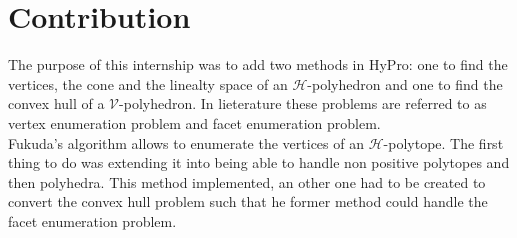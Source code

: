 \section{Contribution}
\label{section_contrib}
The purpose of this internship was to add two methods in HyPro: one to find the vertices, the cone and the linealty space of an $\mathcal{H}$-polyhedron and one to find the convex hull of a $\mathcal{V}$-polyhedron. In lieterature these problems are referred to as vertex enumeration problem and facet enumeration problem.\\
Fukuda's algorithm allows to enumerate the vertices of an $\mathcal{H}$-polytope. The first thing to do was extending it into being able to handle non positive polytopes and then polyhedra. This method implemented, an other one had to be created to convert the convex hull problem such that he former method could handle the facet enumeration problem.


